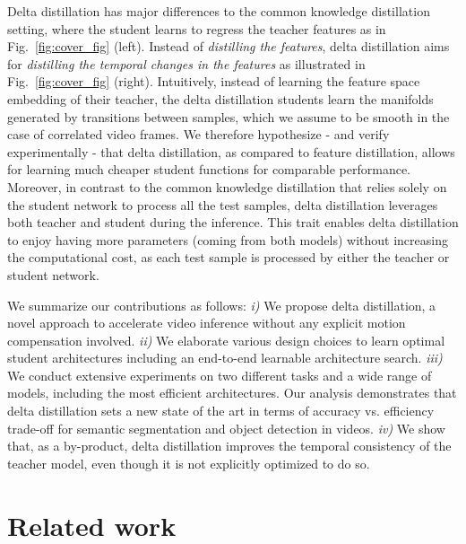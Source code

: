 \documentclass[runningheads]{llncs}
\begin{document}
Delta distillation has major differences to the common knowledge distillation setting, where the student learns to regress the teacher features as in Fig.~\ref{fig:cover_fig} (left). 
Instead of \textit{distilling the features}, delta distillation aims for \emph{distilling the temporal changes in the features} as illustrated in Fig.~\ref{fig:cover_fig} (right).
Intuitively, instead of learning the feature space embedding of their teacher, the delta distillation students learn the manifolds generated by transitions between samples, which we assume to be smooth in the case of correlated video frames.
We therefore hypothesize - and verify experimentally - that delta distillation, as compared to feature distillation, allows for learning much cheaper student functions for comparable performance.
Moreover, in contrast to the common knowledge distillation that relies solely on the student network to process all the test samples, delta distillation leverages both teacher and student during the inference. 
This trait enables delta distillation to enjoy having more parameters (coming from both models) without increasing the computational cost, as each test sample is processed by either the teacher or student network.

We summarize our contributions as follows: 
\emph{i)} We propose delta distillation, a novel approach to accelerate video inference without any explicit motion compensation involved. 
\emph{ii)} We elaborate various design choices to learn optimal student architectures including an end-to-end learnable architecture search.
\emph{iii)} We conduct extensive experiments on two different tasks and a wide range of models, including the most efficient architectures. 
Our analysis demonstrates that delta distillation sets a new state of the art in terms of accuracy vs. efficiency trade-off for semantic segmentation and object detection in videos. 
\emph{iv)} We show that, as a by-product, delta distillation improves the temporal consistency of the teacher model, even though it is not explicitly optimized to do so. \section{Related work}
\label{sec:related_work}
\end{document}
